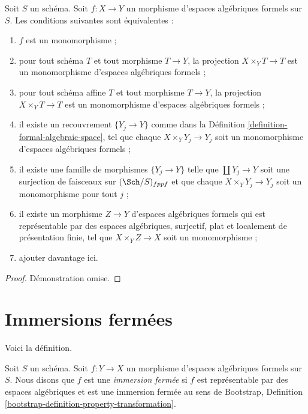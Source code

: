 \begin{lemma}
\label{lemma-characterize-monomorphisms}
Soit $S$ un schéma. Soit $f : X \to Y$ un morphisme d'espaces algébriques formels
sur $S$. Les conditions suivantes sont équivalentes :
\begin{enumerate}
\item $f$ est un monomorphisme ;
\item pour tout schéma $T$ et tout morphisme $T \to Y$,
la projection $X \times_Y T \to T$ est un monomorphisme
d'espaces algébriques formels ;
\item pour tout schéma affine $T$ et tout morphisme $T \to Y$,
la projection $X \times_Y T \to T$ est un monomorphisme d'espaces algébriques
formels ;
\item il existe un recouvrement $\{Y_j \to Y\}$ comme dans la
Définition \ref{definition-formal-algebraic-space},
tel que chaque $X \times_Y Y_j \to Y_j$ soit un monomorphisme
d'espaces algébriques formels ;
\item il existe une famille de morphismes $\{Y_j \to Y\}$ telle
que $\coprod Y_j \to Y$ soit une surjection de faisceaux sur
$(\Sch/S)_{fppf}$ et que chaque $X \times_Y Y_j \to Y_j$ soit un
monomorphisme pour tout $j$ ;
\item il existe un morphisme $Z \to Y$ d'espaces algébriques formels
qui est représentable par des espaces algébriques, surjectif, plat et localement
de présentation finie, tel que $X \times_Y Z \to X$ soit un monomorphisme ;
\item ajouter davantage ici.
\end{enumerate}
\end{lemma}

\begin{proof}
Démonstration omise.
\end{proof}





\section{Immersions fermées}
\label{section-closed-immersions}

\noindent
Voici la définition.

\begin{definition}
\label{definition-closed-immersion}
Soit $S$ un schéma. Soit $f : Y \to X$ un morphisme d'espaces algébriques formels
sur $S$. Nous disons que $f$ est une {\it immersion fermée}
si $f$ est représentable par des espaces algébriques et est une immersion fermée
au sens de
Bootstrap, Definition \ref{bootstrap-definition-property-transformation}.
\end{definition}

